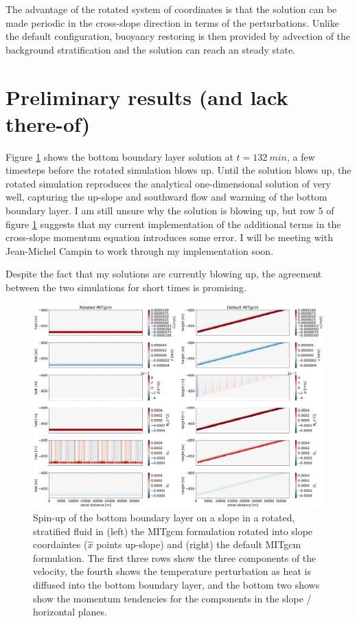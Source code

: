 \documentclass{article}
\begin{document}
The advantage of the rotated system of coordinates is that the solution can be made periodic in the cross-slope direction in terms of the perturbations. Unlike the default configuration, buoyancy restoring is then provided by advection of the background stratification and the solution can reach an steady state.

\section{Preliminary results (and lack there-of)}

Figure \ref{rotated_bbl} shows the bottom boundary layer solution at $t = \SI{132}{min}$, a few timesteps before the rotated simulation blows up. Until the solution blows up, the rotated simulation reproduces the analytical one-dimensional solution of \cite{Garrett1990TheMixing} very well, capturing the up-slope and southward flow and warming of the bottom boundary layer. I am still unsure why the solution is blowing up, but row 5 of figure \ref{rotated_bbl} suggests that my current implementation of the additional terms in the cross-slope momentum equation introduces some error. I will be meeting with Jean-Michel Campin to work through my implementation soon.

Despite the fact that my solutions are currently blowing up, the agreement between the two simulations for short times is promising.

\begin{figure}[htb!]
\noindent\includegraphics[width=1.0\textwidth]{rotated_bbl.png}
\centering
\caption{Spin-up of the bottom boundary layer on a slope in a rotated, stratified fluid in (left) the MITgcm formulation rotated into slope coordaintes ($\hat{x}$ points up-slope) and (right) the default MITgcm formulation. The first three rows show the three components of the velocity, the fourth shows the temperature perturbation as heat is diffused into the bottom boundary layer, and the bottom two shows show the momentum tendencies for the components in the slope / horizontal planes.}
\label{rotated_bbl}
\end{figure}



\end{document}
